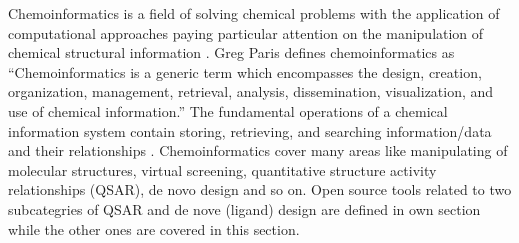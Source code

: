 Chemoinformatics is a field of solving chemical problems with the application of computational approaches paying particular attention on the manipulation of chemical structural information \cite{Leach_2007} . Greg Paris defines chemoinformatics as “Chemoinformatics is a generic term which encompasses the design, creation, organization, management, retrieval, analysis, dissemination, visualization, and use of chemical information.” The fundamental operations of a chemical information system contain storing, retrieving, and searching information/data and their relationships \cite{Gasteiger_2003}\cite{2003}. Chemoinformatics cover many areas like manipulating of molecular structures, virtual screening, quantitative structure activity relationships (QSAR), de novo design and so on. Open source tools related to two subcategries of QSAR and de nove (ligand) design are defined in own section while the other ones are covered in this section.